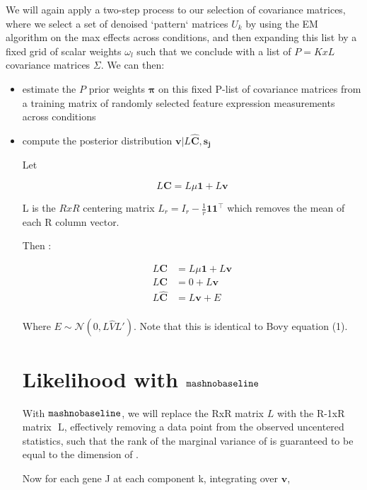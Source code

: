 \documentclass[11pt, oneside]{article}   	%
\newcommand{\Norm}{{\mathcal{N}}} %
\newcommand{\ceff}{\bm{C}}
\newcommand{\wfit}{\bm{w}}
\newcommand{\chat}{\bm{\hat{C}}}
\newcommand{\vb}{\bm{v}}
\def\lstar{\text{ L}}
\def\mnb{{\tt mashnobaseline }}
\begin{document}
We will again apply a two-step process to our selection of covariance matrices, where we select a set of denoised `pattern` matrices $U_{k}$ by using the EM algorithm on the max effects across conditions,
and then expanding this list by a fixed grid of scalar weights $\omega_{l}$ such that we conclude with a list of $P=KxL$ covariance matrices $\Sigma$. We can then:
\begin{itemize}
\item estimate the $P$ prior weights $\bm\pi$ on this fixed P-list of covariance matrices from a training matrix of randomly selected feature expression measurements across conditions
\item compute the posterior distribution $\vb | L \chat, \bm{s_{j}}$

Let 

\begin{equation}
L \ceff = L \mu \bm{1} + L \vb
\end{equation}

L is the $RxR$ centering matrix $L_{r}=I_{r}-{\tfrac  {1}{r}}{\mathbf  {1}}{\mathbf  {1}}^{\top }$ which removes the mean of each R column vector.

Then :

\begin{equation}
\label{model}
\begin{aligned}
L \ceff &= L \mu \bm{1}+ L \vb \\
L \ceff &= 0 + L \vb \\
L \chat &= L \vb + E \\
\end{aligned}
\end{equation}



Where $E \sim \Norm (0, L\hat{V} L')$. Note that this is identical to Bovy equation (1). 





\section{Likelihood with $\mnb$}

With $\mnb$, we will replace the RxR matrix $L$ with the R-1xR matrix $\lstar$, effectively removing a data point from the observed uncentered statistics, such that the rank of the marginal variance of \wfit is guaranteed to be equal to the dimension of \wfit.

Now for each gene J at each component k, integrating over $\vb$, 



\end{itemize}
\end{document}
